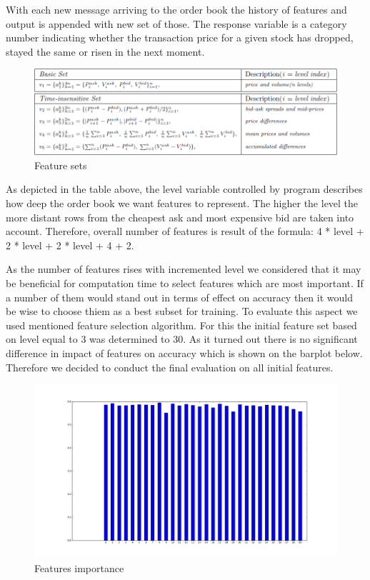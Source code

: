 \documentclass[twoside]{article}
\begin{document}
\begin{multicols}{2}
With each new message arriving to the order book the history of features and output is appended with new set of those.
The response variable is a category number indicating whether the transaction price for a given stock has dropped, stayed the same or risen in the next moment.

\begin{figure}[H]
\centering
\includegraphics[scale=0.23]{../results/feature_sets}
\caption{Feature sets}
\label{ref:rnn}
\end{figure} 

As depicted in the table above, the level variable controlled by program describes how deep the order book we want features to represent. The higher the level the more distant rows from the cheapest ask and most expensive bid are taken into account. Therefore, overall number of features is result of the formula: 4 * level + 2 * level + 2 * level + 4 + 2.

As the number of features rises with incremented level we considered that it may be beneficial for computation time to select features which are most important. If a number of them would stand out in terms of effect on accuracy then it would be wise to choose thiem as a best subset for training.
To evaluate this aspect we used mentioned feature selection algorithm. For this the initial feature set based on level equal to 3 was determined to 30. As it turned out there is no significant difference in impact of features on accuracy which is shown on the barplot below. Therefore we decided to conduct the final evaluation on all initial features.

\begin{figure}[H]
\centering
\includegraphics[scale=0.15]{../results/features}
\caption{Features importance}
\label{ref:rnn}
\end{figure} 


\end{multicols}
\end{document}
